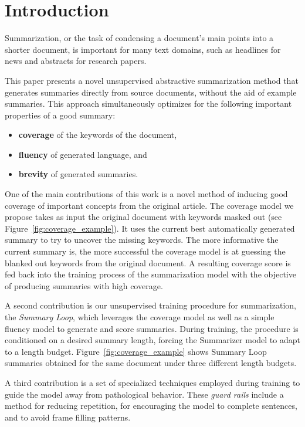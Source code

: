 \documentclass[11pt,a4paper]{article}
\begin{document}
\section{Introduction}

Summarization, or the task of condensing a document's main points into a shorter  document, is important for many text domains, such as headlines for news and abstracts for research papers.  

This paper presents a novel unsupervised abstractive summarization method that generates summaries directly from source documents, without the aid of example summaries.
This  approach simultaneously optimizes for the following important properties of a good summary: 
\begin{itemize}
    \item  \textbf{coverage} of the keywords of the document, 
    \item  \textbf{fluency} of generated language, and 
    \item  \textbf{brevity} of generated summaries.
\end{itemize}

One of the main contributions of this work is a novel method of inducing good coverage of important concepts from the original article. The coverage model we propose takes as input the original document with keywords masked out (see Figure~\ref{fig:coverage_example}). It uses the current best automatically generated summary to try to uncover the missing keywords. The more informative the current summary is, the more successful the coverage model is at guessing the blanked out keywords from the original document. A resulting coverage score is fed back into the training process of the summarization model with the objective of producing  summaries with high coverage.

A second contribution is our unsupervised training procedure for summarization, the \textit{Summary Loop}, which leverages the coverage model as well as a simple fluency model to generate and score summaries. During training, the procedure is conditioned on a desired summary length, forcing the Summarizer model to adapt to a length budget. Figure~\ref{fig:coverage_example} shows Summary Loop summaries obtained for the same document under three different length budgets.

A third contribution is a set of specialized techniques employed during training to guide the model away from pathological behavior. These \textit{guard rails} include a method for reducing repetition, for encouraging the model to complete sentences, and to avoid frame filling patterns.
\end{document}
